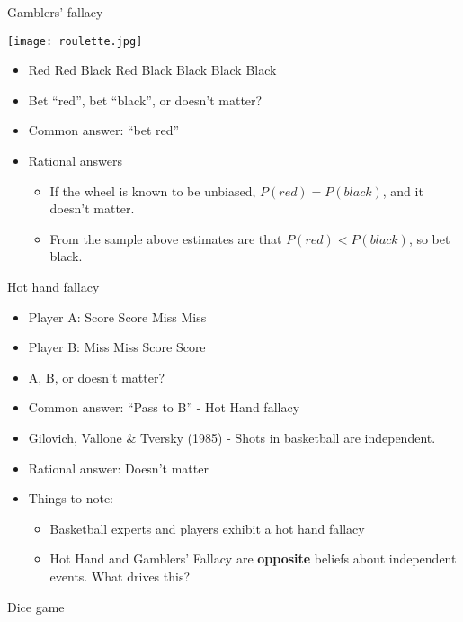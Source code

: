\documentclass{beamer}
\begin{document}
\begin{frame}{Gamblers' fallacy}
\centerline{\texttt{[image: roulette.jpg]}}
\begin{itemize}
\item Red Red Black Red Black Black Black Black 
\item Bet ``red'', bet ``black'', or doesn't matter?
\item Common answer: ``bet red''
\item Rational answers
	\begin{itemize}
		\item If the wheel is known to be unbiased, $P(red) = P(black)$, and it doesn't matter.
		\item From the sample above estimates are that $P(red) < P(black)$, so  bet black.
	\end{itemize}
\end{itemize}
\end{frame}

\begin{frame}{Hot hand fallacy}
\begin{itemize}
\item Player A: Score Score Miss Miss
\item Player B: Miss Miss Score Score
\item A, B, or doesn't matter?
\item Common answer: ``Pass to B'' - Hot Hand fallacy
\item Gilovich, Vallone \& Tversky (1985) - Shots in basketball are independent.
\item Rational answer: Doesn't matter
\item Things to note:
	\begin{itemize}
	\item Basketball experts and players exhibit a hot hand fallacy
	\item Hot Hand and Gamblers' Fallacy are \textbf{opposite} beliefs about independent events. What drives this?
	\end{itemize}
\end{itemize}
\end{frame}

\begin{frame}{Dice game}
\end{frame}

\end{document}
